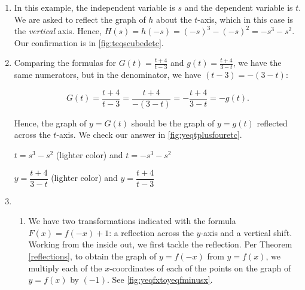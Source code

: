 \begin{ex}
\begin{enumerate}
\begin{enumerate}
  \end{enumerate}
 
  \item  In this example, the independent variable is $s$ and the dependent variable is $t$.   We are asked to reflect the graph of $h$ about the $t$-axis, which in this case is the \textit{vertical} axis.  Hence,  $H(s) = h(-s) = (-s)^3-(-s)^2 = -s^3-s^2$. Our confirmation is in \autoref{fig:teqscubedetc}.
 
 \item Comparing the formulas for $G(t) = \frac{t+4}{t-3}$ and $g(t) =\frac{t+4}{3-t}$, we have the same numerators, but in the denominator, we have $(t-3) = -(3-t)$:  
 
 \[G(t) =  \dfrac{t+4}{t-3} = \dfrac{t+4}{-(3-t)} = - \dfrac{t+4}{3-t} = -g(t). \]
 
Hence, the graph of $y=G(t)$ should be the graph of $y=g(t)$ reflected across the $t$-axis. We check our answer in \autoref{fig:yeqtplusfouretc}.

\begin{mfigure}


\caption{$t =  s^3-s^2$ (lighter color)  and $t=-s^3-s^2$}
\label{fig:teqscubedetc}
\end{mfigure}

\begin{mfigure}


\caption{$y = \dfrac{t+4}{3-t}$ (lighter color) and $y =  \dfrac{t+4}{t-3}$}
\label{fig:yeqtplusfouretc}
\end{mfigure}

\item
 
\begin{enumerate}
 
	\item We have two transformations indicated with the formula $F(x) = f(-x)+1$:  a reflection across the $y$-axis and a vertical shift.  Working from the inside out, we first tackle the reflection.  Per Theorem \ref{reflections}, to obtain the graph of $y=f(-x)$ from $y=f(x)$, we multiply each of the $x$-coordinates of each of the points on the graph of $y=f(x)$ by $(-1)$. See \autoref{fig:yeqfxtoyeqfminusx}.
 
\begin{mfigure}
\begin{graphtrans}


\end{graphtrans}
\end{mfigure}
\end{enumerate}
\end{enumerate}
\end{ex}
